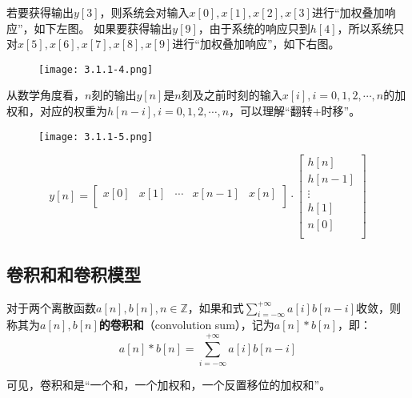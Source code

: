 若要获得输出$y\left[ 3 \right] $，则系统会对输入$x\left[ 0 \right] ,x\left[ 1 \right] ,x\left[ 2 \right] ,x\left[ 3 \right] $进行“加权叠加响应”，如下左图。
如果要获得输出$y\left[ 9 \right] $，由于系统的响应只到$h\left[ 4 \right] $，所以系统只对$x\left[ 5 \right] ,x\left[ 6 \right] ,x\left[ 7 \right] ,x\left[ 8 \right] ,x\left[ 9 \right] $进行“加权叠加响应”，如下右图。
\begin{figure}[h]
\centering
\texttt{[image: 3.1.1-4.png]}
\end{figure}

从数学角度看，$n$刻的输出$y\left[ n \right] $是$n$刻及之前时刻的输入$x\left[ i \right] ,i=0,1,2,\cdots ,n$的加权和，对应的权重为$h\left[ n-i \right] ,i=0,1,2,\cdots ,n$，可以理解“翻转+时移”。
\begin{figure}[h]
\centering
\texttt{[image: 3.1.1-5.png]}
\end{figure}
\[
y\left[ n \right] =\left[ \begin{matrix}
	x\left[ 0 \right]&		x\left[ 1 \right]&		\cdots&		x\left[ n-1 \right]&		x\left[ n \right]\\
\end{matrix} \right] \cdot \left[ \begin{array}{c}
	h\left[ n \right]\\
	h\left[ n-1 \right]\\
	\vdots\\
	h\left[ 1 \right]\\
	n\left[ 0 \right]\\
\end{array} \right]
\]

\subsection{卷积和和卷积模型}

\begin{definition}[卷积和]
对于两个离散函数$a\left[ n \right] ,b\left[ n \right] ,n\in \mathbb{Z} $，如果和式$\sum_{i=-\infty}^{+\infty}{a\left[ i \right] b\left[ n-i \right]}$收敛，则称其为{\bf $a\left[ n \right] ,b\left[ n \right] $的卷积和}（convolution sum），记为$a\left[ n \right] \ast b\left[ n \right] $，即：
\[
a\left[ n \right] \ast b\left[ n \right] =\sum_{i=-\infty}^{+\infty}{a\left[ i \right] b\left[ n-i \right]}
\]
\end{definition}

可见，卷积和是“一个和，一个加权和，一个反置移位的加权和”。

